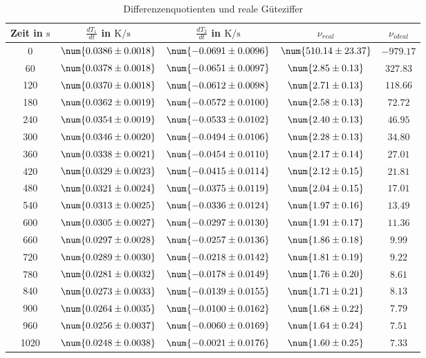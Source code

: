 \begin{table} 
 \centering 
 \begin{tabular}{S S S S S } 
 \toprule  
{Zeit in $\si{\second}$} & {$\frac{dT_1}{dt}$ in $\si{\kelvin \per \second}$} & {$\frac{dT_2}{dt}$ in $\si{\kelvin \per \second}$} & {$\nu_{real}$}& {$\nu_{ideal}$} \\ 
 & $\num{ 0.0386 \pm 0.0018 }$ & $\num{ -0.0691 \pm 0.0096 }$ & $\num{ 510.14 \pm 23.37 }$ & $\num{ -979.17 }$\\ 
60 & $\num{ 0.0378 \pm 0.0018 }$ & $\num{ -0.0651 \pm 0.0097 }$ & $\num{ 2.85 \pm 0.13 }$ & $\num{ 327.83 }$\\ 
120 & $\num{ 0.0370 \pm 0.0018 }$ & $\num{ -0.0612 \pm 0.0098 }$ & $\num{ 2.71 \pm 0.13 }$ & $\num{ 118.66 }$\\ 
180 & $\num{ 0.0362 \pm 0.0019 }$ & $\num{ -0.0572 \pm 0.0100 }$ & $\num{ 2.58 \pm 0.13 }$ & $\num{ 72.72 }$\\ 
240 & $\num{ 0.0354 \pm 0.0019 }$ & $\num{ -0.0533 \pm 0.0102 }$ & $\num{ 2.40 \pm 0.13 }$ & $\num{ 46.95 }$\\ 
300 & $\num{ 0.0346 \pm 0.0020 }$ & $\num{ -0.0494 \pm 0.0106 }$ & $\num{ 2.28 \pm 0.13 }$ & $\num{ 34.80 }$\\ 
360 & $\num{ 0.0338 \pm 0.0021 }$ & $\num{ -0.0454 \pm 0.0110 }$ & $\num{ 2.17 \pm 0.14 }$ & $\num{ 27.01 }$\\ 
420 & $\num{ 0.0329 \pm 0.0023 }$ & $\num{ -0.0415 \pm 0.0114 }$ & $\num{ 2.12 \pm 0.15 }$ & $\num{ 21.81 }$\\ 
480 & $\num{ 0.0321 \pm 0.0024 }$ & $\num{ -0.0375 \pm 0.0119 }$ & $\num{ 2.04 \pm 0.15 }$ & $\num{ 17.01 }$\\ 
540 & $\num{ 0.0313 \pm 0.0025 }$ & $\num{ -0.0336 \pm 0.0124 }$ & $\num{ 1.97 \pm 0.16 }$ & $\num{ 13.49 }$\\ 
600 & $\num{ 0.0305 \pm 0.0027 }$ & $\num{ -0.0297 \pm 0.0130 }$ & $\num{ 1.91 \pm 0.17 }$ & $\num{ 11.36 }$\\ 
660 & $\num{ 0.0297 \pm 0.0028 }$ & $\num{ -0.0257 \pm 0.0136 }$ & $\num{ 1.86 \pm 0.18 }$ & $\num{ 9.99 }$\\ 
720 & $\num{ 0.0289 \pm 0.0030 }$ & $\num{ -0.0218 \pm 0.0142 }$ & $\num{ 1.81 \pm 0.19 }$ & $\num{ 9.22 }$\\ 
780 & $\num{ 0.0281 \pm 0.0032 }$ & $\num{ -0.0178 \pm 0.0149 }$ & $\num{ 1.76 \pm 0.20 }$ & $\num{ 8.61 }$\\ 
840 & $\num{ 0.0273 \pm 0.0033 }$ & $\num{ -0.0139 \pm 0.0155 }$ & $\num{ 1.71 \pm 0.21 }$ & $\num{ 8.13 }$\\ 
900 & $\num{ 0.0264 \pm 0.0035 }$ & $\num{ -0.0100 \pm 0.0162 }$ & $\num{ 1.68 \pm 0.22 }$ & $\num{ 7.79 }$\\ 
960 & $\num{ 0.0256 \pm 0.0037 }$ & $\num{ -0.0060 \pm 0.0169 }$ & $\num{ 1.64 \pm 0.24 }$ & $\num{ 7.51 }$\\ 
1020 & $\num{ 0.0248 \pm 0.0038 }$ & $\num{ -0.0021 \pm 0.0176 }$ & $\num{ 1.60 \pm 0.25 }$ & $\num{ 7.33 }$\\ 
\bottomrule 
 \end{tabular} 
 \caption{Differenzenquotienten und reale Güteziffer} 
 \label{tab: dTdt} 
  \end{table}